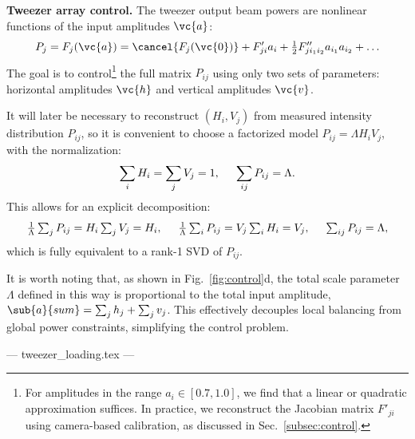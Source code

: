 \textbf{Tweezer array control.} The tweezer output beam powers are nonlinear functions of the input amplitudes $\vc{a}$:
\begin{equation}
    \label{eq:taylerexp}
    P_j = F_j(\vc{a}) = \cancel{F_j(\vc{0})} + F'_{ji} a_i + \tfrac{1}{2} F''_{j i_1 i_2} a_{i_1} a_{i_2} + \ldots
\end{equation}
The goal is to control\footnote{
    For amplitudes in the range $a_i \in [0.7, 1.0]$, we find that a linear or quadratic approximation suffices. In practice, we reconstruct the Jacobian matrix $F'_{ji}$ using camera-based calibration, as discussed in Sec.~\ref{subsec:control}.
} the full matrix $P_{ij}$ using only two sets of parameters: horizontal amplitudes $\vc{h}$ and vertical amplitudes $\vc{v}$. 

It will later be necessary to reconstruct $(H_i, V_j)$ from measured intensity distribution $P_{ij}$, so it is convenient to choose a factorized model $P_{ij} = \Lambda H_i V_j$, with the normalization:
\begin{equation*}
    \sum_i H_i = \sum_j V_j = 1, \hspace{5 mm} \sum_{ij} P_{ij} = \Lambda.
\end{equation*}
This allows for an explicit decomposition:
\begin{equation}
    \textstyle
    \frac{1}{\Lambda} \sum_j P_{ij} = H_i \sum_j V_j = H_i,
    \hspace{5 mm} 
    \frac{1}{\Lambda} \sum_i P_{ij} = V_j \sum_i H_i = V_j,
    \hspace{5 mm} 
    \sum_{ij} P_{ij} = \Lambda,
    \label{uv-decomposition}
\end{equation}
which is fully equivalent to a rank-1 SVD of $P_{ij}$.

It is worth noting that, as shown in Fig.~\ref{fig:control}d, the total scale parameter $\Lambda$ defined in this way is proportional to the total input amplitude, $\sub{a}{sum} = \sum_j h_j + \sum_j v_j$. This effectively decouples local balancing from global power constraints, simplifying the control problem.



--- tweezer_loading.tex ---


